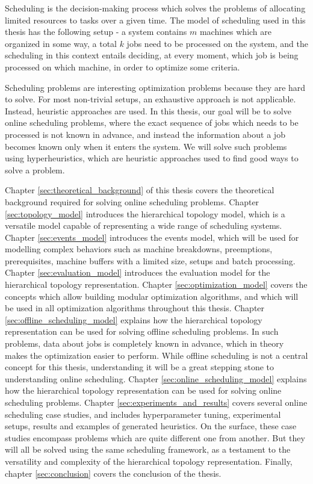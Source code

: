 Scheduling is the decision-making process which solves the problems of allocating limited resources to tasks over a given time. The model of scheduling used in this thesis has the following setup - a system contains $m$ machines which are organized in some way, a total $k$ jobs need to be processed on the system, and the scheduling in this context entails deciding, at every moment, which job is being processed on which machine, in order to optimize some criteria. 

Scheduling problems are interesting optimization problems because they are hard to solve. For most non-trivial setups, an exhaustive approach is not applicable. Instead, heuristic approaches are used. In this thesis, our goal will be to solve online scheduling problems, where the exact sequence of jobs which needs to be processed is not known in advance, and instead the information about a job becomes known only when it enters the system. We will solve such problems using hyperheuristics, which are heuristic approaches used to find good ways to solve a problem.

Chapter \ref{sec:theoretical_background} of this thesis covers the theoretical background required for solving online scheduling problems. Chapter \ref{sec:topology_model} introduces the hierarchical topology model, which is a versatile model capable of representing a wide range of scheduling systems. Chapter \ref{sec:events_model} introduces the events model, which will be used for modelling complex behaviors such as machine breakdowns, preemptions, prerequisites, machine buffers with a limited size, setups and batch processing. Chapter \ref{sec:evaluation_model} introduces the evaluation model for the hierarchical topology representation. Chapter \ref{sec:optimization_model} covers the concepts which allow building modular optimization algorithms, and which will be used in all optimization algorithms throughout this thesis. Chapter \ref{sec:offline_scheduling_model} explains how the hierarchical topology representation can be used for solving offline scheduling problems. In such problems, data about jobs is completely known in advance, which in theory makes the optimization easier to perform. While offline scheduling is not a central concept for this thesis, understanding it will be a great stepping stone to understanding online scheduling. Chapter \ref{sec:online_scheduling_model} explains how the hierarchical topology representation can be used for solving online scheduling problems. Chapter \ref{sec:experiments_and_results} covers several online scheduling case studies, and includes hyperparameter tuning, experimental setups, results and examples of generated heuristics. On the surface, these case studies encompass problems which are quite different one from another. But they will all be solved using the same scheduling framework, as a testament to the versatility and complexity of the hierarchical topology representation. Finally, chapter \ref{sec:conclusion} covers the conclusion of the thesis.